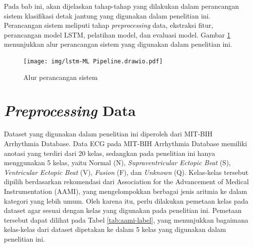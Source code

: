 






Pada bab ini, akan dijelaskan tahap-tahap yang dilakukan dalam perancangan sistem klasifikasi detak jantung yang digunakan dalam penelitian ini.
Perancangan sistem meliputi tahap \textit{preprocessing} data, ekstraksi fitur, perancangan model LSTM, pelatihan model, dan evaluasi model.
Gambar \ref{fig:alur-sistem} menunjukkan alur perancangan sistem yang digunakan dalam penelitian ini.

%
\begin{figure}[H]
  \begin{center}
    \texttt{[image: img/lstm-ML Pipeline.drawio.pdf]}
  \end{center}
  \caption{Alur perancangan sistem}
  \label{fig:alur-sistem}
\end{figure}

\section{\emph{Preprocessing} Data}
\label{subsec: bab4-preprocessing-data}
 
Dataset yang digunakan dalam penelitian ini diperoleh dari MIT-BIH Arrhythmia Database.
Data ECG pada MIT-BIH Arrhythmia Database memiliki anotasi yang terdiri dari 20 kelas, sedangkan pada penelitian ini hanya menggunakan 5 kelas, yaitu Normal (N), \textit{Supraventricular Ectopic Beat} (S), \textit{Ventricular Ectopic Beat} (V), \textit{Fusion} (F), dan \textit{Unknown} (Q).
Kelas-kelas tersebut dipilih berdasarkan rekomendasi dari Association for the Advancement of Medical Instrumentation (AAMI), yang mengelompokkan berbagai jenis aritmia ke dalam kategori yang lebih umum.
Oleh karena itu, perlu dilakukan pemetaan kelas pada dataset agar sesuai dengan kelas yang digunakan pada penelitian ini.
Pemetaan tersebut dapat dilihat pada Tabel \ref{tab:aami-label}, yang menunjukkan bagaimana kelas-kelas dari dataset dipetakan ke dalam 5 kelas yang digunakan dalam penelitian ini.

